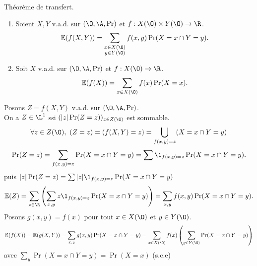 \documentclass[11pt]{article}
\renewcommand*{\E}{\mathbb{E}}
\begin{document}
\vspace*{-0.8cm}

\begin{thm}{Théorème de transfert.}{}
    \begin{enumerate}
        \item Soient $X,Y$ v.a.d. sur $(\O,\A,\Pr)$ et $f:X(\O)\times Y(\O)\to\R$.
        \begin{equation*}
            \E(f(X,Y)) = \sum_{\substack{x\in X(\O)\\y\in Y(\O)}}f(x,y)\Pr(X=x \cap Y=y).
        \end{equation*}
        \item Soit $X$ v.a.d. sur $(\O,\A,\Pr)$ et $f:X(\O)\to \R$.
        \begin{equation*}
            \E(f(X))=\sum_{x\in X(\O)}f(x)\Pr(X=x).
        \end{equation*}
    \end{enumerate}
    \tcblower
     Posons $Z=f(X,Y)$ v.a.d. sur $(\O,\A,\Pr)$.\\
    On a $Z\in\L^1$ ssi $(|z|\Pr(Z=z))_{z\in Z(\O)}$ est sommable.
    \begin{equation*}
        \forall z \in Z(\O), ~ (Z=z)=(f(X,Y)=z)=\bigcup_{f(x,y)=z}(X=x\cap Y=y) 
    \end{equation*}
    \begin{equation*}
        \Pr(Z=z)=\sum_{f(x,y)=z}\Pr(X=x\cap Y=y) = \sum \1_{f(x,y)=z}\Pr(X=x\cap Y=y).
    \end{equation*}
    puis $|z|\Pr(Z=z)=\sum|z|\1_{f(x,y)=z}\Pr(X=x\cap Y=y)$
    \begin{equation*}
        \E(Z) = \sum_{z\in\R}\left( \sum_{x,y} z\1_{f(x,y)=z} \Pr(X=x\cap Y=y)\right) = \sum_{x,y}f(x,y)\Pr(X=x\cap Y=y).
    \end{equation*}
     Posons $g(x,y)=f(x)$ pour tout $x\in X(\O)$ et $y\in Y(\O)$.
    \begin{equation*}
        \E(f(X)) = \E(g(X,Y)) = \sum_{x,y} g(x,y)\Pr(X=x\cap Y=y) = \sum_{x\in X(\O)}f(x) \left( \sum_{y\in Y(\O)} \Pr(X=x\cap Y=y)\right)
    \end{equation*}
    avec $\sum_y \Pr(X=x\cap Y=y) = \Pr(X=x)$ (s.c.e)
\end{thm}
\end{document}

